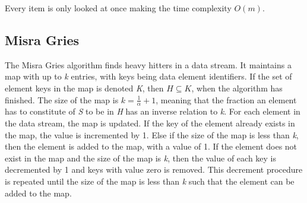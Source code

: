 Every item is only looked at once making the time complexity \(O(m)\).


\subsection{Misra Gries}
The Misra Gries algorithm finds heavy hitters in a data stream. It maintains a map with up to \textit{k} entries, with keys being data element identifiers. If the set of element keys in the map is denoted \textit{K}, then \(H \subseteq K\), when the algorithm has finished. The size of the map is \(k = \frac{1}{\alpha} + 1\), meaning that the fraction an element has to constitute of \textit{S} to be in \textit{H} has an inverse relation to \textit{k}.
For each element in the data stream, the map is updated. If the key of the element already exists in the map, the value is incremented by 1. Else if the size of the map is less than \textit{k}, then the element is added to the map, with a value of 1. If the element does not exist in the map and the size of the map is \textit{k}, then the value of each key is decremented by 1 and keys with value zero is removed. This decrement procedure is repeated until the size of the map is less than \textit{k} such that the element can be added to the map.


